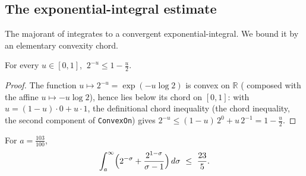 \subsection{The exponential-integral estimate}

The majorant of  integrates to a convergent
exponential-integral. We bound it by an elementary convexity chord.

\begin{lemma}
\label{lem:le_two_pow_chord}
\leanok
For every $u\in[0,1]$, $\ 2^{-u}\le 1-\tfrac u2$.
\end{lemma}

\begin{proof}
\leanok
The function $u\mapsto2^{-u}=\exp(-u\log2)$ is convex on $\mathbb R$
( composed with the affine $u\mapsto-u\log2$), hence lies below its
chord on $[0,1]$: with $u=(1-u)\cdot0+u\cdot1$, the definitional chord inequality
(the chord inequality, the second component of \texttt{ConvexOn}) gives
$2^{-u}\le(1-u)\,2^{0}+u\,2^{-1}=1-\tfrac u2$.
\end{proof}

\begin{lemma}
\label{lem:le_tail_int_bound}
\leanok
{}
For $a=\tfrac{103}{100}$,
\[
  \int_a^\infty\Bigl(2^{-\sigma}+\frac{2^{1-\sigma}}{\sigma-1}\Bigr)\,d\sigma
    \ \le\ \frac{23}5 .
\]
\end{lemma}

